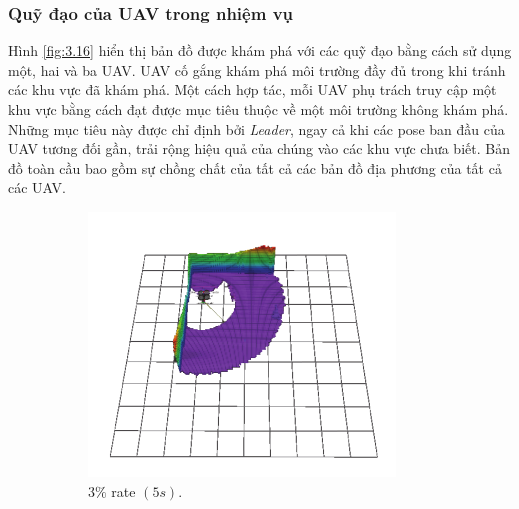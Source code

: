 \documentclass[11pt,openany]{book}
\begin{document}
\subsubsection{Quỹ đạo của UAV trong nhiệm vụ}
Hình \ref{fig:3.16} hiển thị bản đồ được khám phá với các quỹ đạo bằng cách sử dụng một, hai và ba UAV. UAV cố gắng khám phá môi trường đầy đủ trong khi tránh các khu vực đã khám phá. Một cách hợp tác, mỗi UAV phụ trách truy cập một khu vực bằng cách đạt được mục tiêu thuộc về một môi trường không khám phá. Những mục tiêu này được chỉ định bởi \textit{Leader}, ngay cả khi các pose ban đầu của UAV tương đối gần, trải rộng hiệu quả của chúng vào các khu vực chưa biết. Bản đồ toàn cầu bao gồm sự chồng chất của tất cả các bản đồ địa phương của tất cả các UAV.
\begin{figure}[H]
    \centering
    \begin{subfigure}[H]{0.3\linewidth}
        \centering
        \includegraphics[width=\linewidth]{assets/3_13_a.png}
        \caption{{$3\%$ rate $(5s).$}}
        \label{fig:3.13a}
    \end{subfigure}
    \begin{subfigure}[H]{0.3\linewidth}
        \centering

\end{subfigure}
\end{figure}
\end{document}
